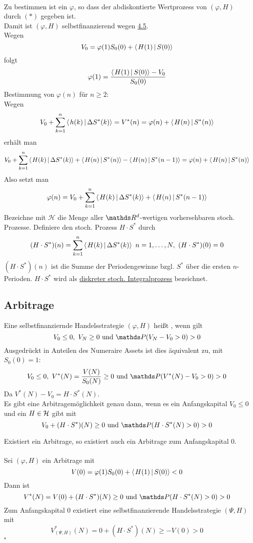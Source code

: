 \\
Zu bestimmen ist ein $\varphi$, so dass der abdiskontierte Wertprozess von $(\varphi,H)$ durch $(\ast)$ gegeben ist.\\
Damit ist $(\varphi,H)$ selbstfinanzierend wegen \hyperref[sub:charkt_selbstfinanzierung]{4.5}.\\
Wegen
\[
V_0=\varphi(1)S_0(0)+\sprod{H(1)}{S(0)}
\]
folgt
\[
\varphi(1)=\frac{\sprod{H(1)}{S(0)}-V_0}{S_0(0)}
\]
Bestimmung von $\varphi(n)$ für $n\ge 2$:\\
Wegen
\[
V_0+\sum_{k=1}^{n}\sprod{h(k)}{\Delta S^*(k)}=V^*(n)=\varphi(n)+\sprod{H(n)}{S^*(n)}
\]
erhält man
\[
V_0+\sum_{k=1}^{n}\sprod{H(k)}{\Delta S^*(k)}+\sprod{H(n)}{S^*(n)}-\sprod{H(n)}{S^*(n-1)}=\varphi(n)+\sprod{H(n)}{S^*(n)}
\]
Also setzt man
\[
\varphi(n)=V_0+\sum_{k=1}^{n}\sprod{H(k)}{\Delta S^*(k)}+\sprod{H(n)}{S^*(n-1)}
\]
Bezeichne mit $\mathcal{H}$ die Menge aller $\R^d$-wertigen vorhersehbaren stoch. Prozesse.
Definiere den stoch. Prozess $H\cdot S^*$ durch
\[
(H\cdot S^*)(n)=\sum_{k=1}^{n}\sprod{H(k)}{\Delta S^*(k)}~ n=1,\dots,N,~ (H\cdot S^*)(0)=0
\]
$(H\cdot S^*)(n)$ ist die Summe der Periodengewinne bzgl. $S^*$ über die ersten $n$-Perioden.
$H\cdot S^*$ wird als \uline{diskreter stoch. Integralprozess} bezeichnet.


\subsection{Arbitrage}
\label{sub:arbitrage_math}
Eine selbstfinanziernde Handelsstrategie $(\varphi,H)$ heißt , wenn gilt 
\[
V_0\le 0,~V_N\ge 0 \text{ und } \Pw(V_N-V_0>0)>0
\]
Ausgedrückt in Anteilen des Numeraire Assets ist dies äquivalent zu, mit $S_0(0)=1$:
\[
V_0\le 0,~ V^*(N)=\frac{V(N)}{S_0(N)}\ge 0 \text{ und } \Pw(V^*(N)-V_0 > 0) > 0
\]
Da $V^*(N)-V_0=H\cdot S^*(N)$.\\
Es gibt eine Arbitragemöglichkeit genau dann, wenn es ein Anfangskapital $V_0\le 0$ und ein $H\in \mathcal{H}$ gibt mit
\[
V_0+(H\cdot S^*)(N)\ge 0 \text{ und } \Pw(H\cdot S^*(N)>0)>0
\]

Existiert ein Arbitrage, so existiert auch ein Arbitrage zum Anfangskapital 0.\\

\\
Sei $(\varphi,H)$ ein Arbitrage mit
\[
V(0)=\varphi(1)S_0(0)+\sprod{H(1)}{S(0)}<0
\]
Dann ist
\[
V^*(N)=V(0)+(H\cdot S^*)(N)\ge 0 \text{ und } \Pw(H\cdot S^*(N)>0)>0
\]
Zum Anfangskapital 0 existiert eine selbstfinanzierende Handelsstrategie $(\Psi,H)$ mit 
\[
V_{(\Psi,H)}^*(N)= 0+ (H\cdot S^*)(N)\ge -V(0)>0
\]
\hfill $\square$

